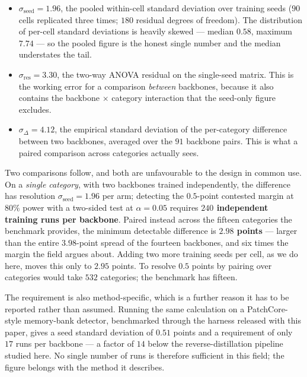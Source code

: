 \begin{itemize}
\item $\sigma_{\text{seed}} = 1.96$, the pooled within-cell standard deviation
over training seeds ($90$ cells replicated three times; $180$ residual degrees of
freedom). The distribution of per-cell standard deviations is heavily skewed ---
median $0.58$, maximum $7.74$ --- so the pooled figure is the honest single number
and the median understates the tail.
\item $\sigma_{\text{res}} = 3.30$, the two-way ANOVA residual on the single-seed
matrix. This is the working error for a comparison \emph{between} backbones,
because it also contains the backbone $\times$ category interaction that the
seed-only figure excludes.
\item $\sigma_{\Delta} = 4.12$, the empirical standard deviation of the
per-category difference between two backbones, averaged over the $91$ backbone
pairs. This is what a paired comparison across categories actually sees.
\end{itemize}

Two comparisons follow, and both are unfavourable to the design in common use. On
a \emph{single category}, with two backbones trained independently, the difference
has resolution $\sigma_{\text{seed}} = 1.96$ per arm; detecting the $0.5$-point
contested margin at $80\%$ power with a two-sided test at $\alpha = 0.05$ requires
\textbf{$240$ independent training runs per backbone}. Paired instead across the
fifteen categories the benchmark provides, the minimum detectable difference is
\textbf{$2.98$ points} --- larger than the entire $3.98$-point spread of the
fourteen backbones, and six times the margin the field argues about. Adding two
more training seeds per cell, as we do here, moves this only to $2.95$ points. To
resolve $0.5$ points by pairing over categories would take $532$ categories; the
benchmark has fifteen.

The requirement is also method-specific, which is a further reason it has to be
reported rather than assumed. Running the same calculation on a PatchCore-style
memory-bank detector, benchmarked through the harness released with this paper,
gives a seed standard deviation of $0.51$ points and a requirement of only $17$
runs per backbone --- a factor of $14$ below the reverse-distillation pipeline
studied here. No single number of runs is therefore sufficient in this field; the
figure belongs with the method it describes.

